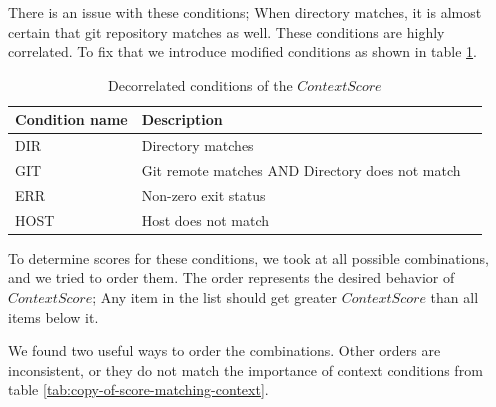 There is an issue with these conditions; When directory matches, it is almost certain that git repository matches as well. These conditions are highly correlated.
To fix that we introduce modified conditions as shown in table \ref{tab:score-context-impl-decorrelated}.

\begin{table}[h!]
\centering
\begin{tabular}{lll}
\hline \hline
Condition name & Description \\
\hline
DIR & Directory matches \\ 
GIT & Git remote matches AND Directory does not match\\ 
ERR & Non-zero exit status \\
HOST & Host does not match \\ 
\hline \hline
\end{tabular}
\caption{Decorrelated conditions of the \(ContextScore\)}
\label{tab:score-context-impl-decorrelated}
\end{table}

To determine scores for these conditions, we took at all possible combinations, and we tried to order them. The order represents the desired behavior of \(ContextScore\); Any item in the list should get greater \(ContextScore\) than all items below it.


We found two useful ways to order the combinations. Other orders are inconsistent, or they do not match the importance of context conditions from table \ref{tab:copy-of-score-matching-context}. %

